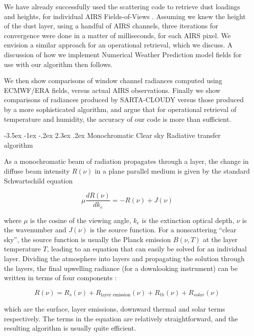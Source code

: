 \documentclass[11pt]{article}
\makeatletter
\newcommand{\sasc}{\textsf{SARTA-CLOUDY}\xspace}
\renewcommand{\section}{\@startsection {section}{1}{\z@}%
                                   {-3.5ex \@plus -1ex \@minus -.2ex}%
                                   {2.3ex \@plus.2ex}%
                                   {\reset@font\large\bfseries}}
\makeatother
\begin{document}
We have already successfully used the scattering code to retrieve dust loadings and heights, for individual AIRS 
Fields-of-Views \cite{mac:10}. Assuming we knew the height of the dust layer, using a handful of AIRS channels, 
three iterations for convergence were done in a matter of milliseconds, for each AIRS pixel. We envision a similar approach 
for an operational retrieval, which we discuss. A discussion of how we implement Numerical Weather Prediction model 
fields for use with our algorithm then follows. 

We then show comparisons of window channel radiances computed using ECMWF/ERA fields, versus actual AIRS observations. Finally
we show comparisons of radiances produced by \sasc versus those produced by a more sophisticated algorithm, and argue that
for operational retrieval of temperature and humidity, the accuracy of our code is more than sufficient.

\section{Monochromatic Clear sky Radiative transfer algorithm}

As a monochromatic beam of radiation propagates through a layer, the change in diffuse beam
intensity $R(\nu)$ in a plane parallel medium is given by the standard
Schwartschild equation \cite{lio:80,goo:89,edw:92}

\begin{equation}
\mu \frac{dR(\nu)}{dk_{e}} = -R(\nu) + J(\nu)
\label{eqn:sch}
\end{equation}

where $\mu$ is the cosine of the viewing angle, $k_{e}$ is the extinction
optical depth, $\nu$ is the wavenumber and $J(\nu)$ is the source function. For
a nonscattering ``clear sky'', the source function is usually the Planck
emission $B(\nu,T)$ at the layer temperature $T$, leading to an equation that
can easily be solved for an individual layer. Dividing the atmosphere into
layers and propagating the solution through the layers, the final upwelling radiance
(for a downlooking instrument) can be written in terms of four components :

\begin{equation}
R(\nu) = R_{s}(\nu) + R_{\text{layer emission}}(\nu) + R_{th}(\nu) + R_{solar}(\nu)
\label{eqn:sch_detail}
\end{equation}

which are the surface, layer emissions, downward thermal and solar terms
respectively. The terms in the equation are relatively straightforward, and the resulting algorithm is 
usually quite efficient. 
\end{document}
